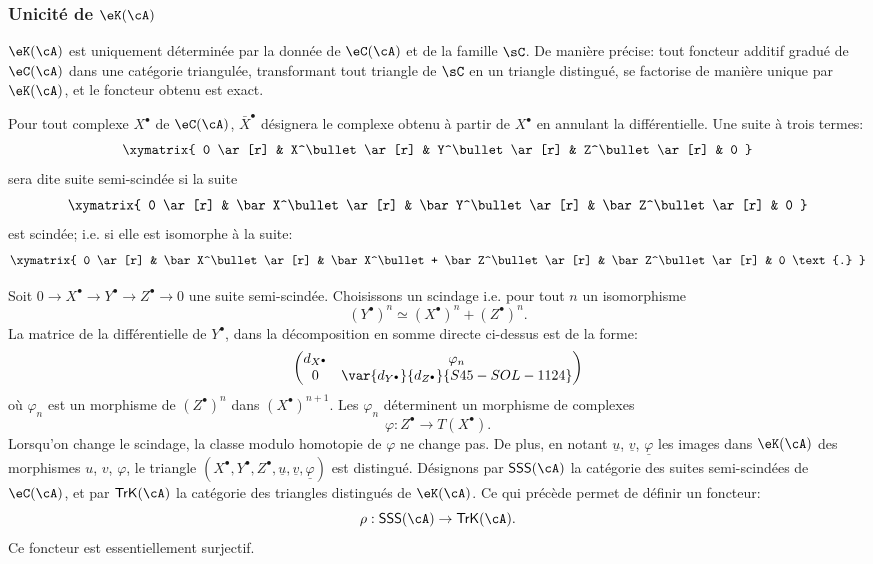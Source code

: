 \subsubsection{Unicité de $\eK(\cA)$}\label{VIII:1-2-4}

$\eK(\cA)$ est uniquement déterminée par la donnée de $\eC(\cA)$ et de la 
famille $\sC$. De manière précise: tout foncteur additif gradué de 
$\eC(\cA)$ dans une catégorie triangulée, transformant tout triangle de 
$\sC$ en un triangle distingué, se factorise de manière unique par 
$\eK(\cA)$, et le foncteur obtenu est exact. 

Pour tout complexe $X^\bullet$ de $\eC(\cA)$, $\bar X^\bullet$ désignera le 
complexe obtenu à partir de $X^\bullet$ en annulant la différentielle. Une 
suite à trois termes: 
\[\xymatrix{
  0 \ar[r] 
    & X^\bullet \ar[r] 
    & Y^\bullet \ar[r] 
    & Z^\bullet \ar[r] 
    & 0 
}\]
sera dite suite semi-scindée si la suite 
\[\xymatrix{
  0 \ar[r] 
    & \bar X^\bullet \ar[r] 
    & \bar Y^\bullet \ar[r] 
    & \bar Z^\bullet \ar[r] 
    & 0 
}\]
est scindée; i.e. si elle est isomorphe à la suite: 
\[\xymatrix{
  0 \ar[r] 
    & \bar X^\bullet \ar[r] 
    & \bar X^\bullet + \bar Z^\bullet \ar[r] 
    & \bar Z^\bullet \ar[r] 
    & 0 \text{.}
}\]

Soit $0 \to X^\bullet \to Y^\bullet \to Z^\bullet \to 0$ une suite 
semi-scindée. Choisissons un scindage i.e. pour tout $n$ un isomorphisme 
\[
  (Y^\bullet)^n \simeq (X^\bullet)^n + (Z^\bullet)^n \text{.}
\]
La matrice de la différentielle de $Y^\bullet$, dans la décomposition en 
somme directe ci-dessus est de la forme: 
\[
  \begin{pmatrix}
    d_{X^\bullet} & \varphi_n \\
    0 & \var{d_{Y^\bullet}}{d_{Z^\bullet}}{S45-SOL-1124} 
  \end{pmatrix}
\]
où $\varphi_n$ est un morphisme de $(Z^\bullet)^n$ dans 
$(X^\bullet)^{n+1}$. Les $\varphi_n$ déterminent un morphisme de complexes 
\[
  \varphi:Z^\bullet \to T(X^\bullet) \text{.}
\]
Lorsqu'on change le scindage, la classe modulo homotopie de $\varphi$ ne 
change pas. De plus, en notant $\underline u$, $\underline v$, 
$\underline\varphi$ les images dans $\eK(\cA)$ des morphismes $u$, $v$, 
$\varphi$, le triangle 
$(X^\bullet,Y^\bullet,Z^\bullet,\underline u,\underline v,\underline\varphi)$ 
est distingué. Désignons par $\mathsf{SSS}(\cA)$ la catégorie des 
suites semi-scindées de $\eC(\cA)$, et par $\mathsf{TrK}(\cA)$ la 
catégorie des triangles distingués de $\eK(\cA)$. Ce qui précède 
permet de définir un foncteur: 
\[
  \rho:\mathsf{SSS}(\cA) \to \mathsf{TrK}(\cA) \text{.}
\]
Ce foncteur est essentiellement surjectif. 











